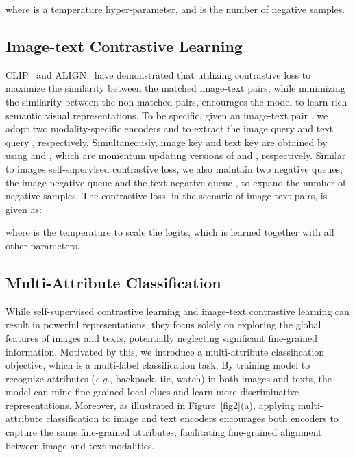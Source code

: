 \documentclass[final]{cvpr}
\begin{document}
\vspace{-1mm}
\noindent
where  is a temperature hyper-parameter, and  is the number of negative samples.

\subsection{Image-text Contrastive Learning}
CLIP~\cite{radford2021learning} and ALIGN~\cite{jia2021scaling} have demonstrated that utilizing contrastive loss to maximize the similarity between the matched image-text pairs, while minimizing the similarity between the non-matched pairs, encourages the model to learn rich semantic visual representations.
To be specific, given an image-text pair , we adopt two modality-specific encoders  and  to extract the image query  and text query , respectively. 
Simultaneously, image key  and text key  are obtained by using  and , which are momentum updating versions of  and , respectively. 
Similar to images self-supervised contrastive loss, we also maintain two negative queues, the image negative queue  and the text negative queue , to expand the number of negative samples.
The contrastive loss, in the scenario of image-text pairs, is given as:  \par
\begin{small}

\end{small}

\vspace{-2mm}
\noindent
where  is the temperature to scale the logits, which is learned together with all other parameters.

\subsection{Multi-Attribute Classification}
While self-supervised contrastive learning and image-text contrastive learning can result in powerful representations, they focus solely on exploring the global features of images and texts, potentially neglecting significant fine-grained information.
Motivated by this, we introduce a multi-attribute classification objective, which is a multi-label classification task. 
By training model to recognize attributes (\emph{e.g.}, backpack, tie, watch) in both images and texts, the model can mine fine-grained local clues and learn more discriminative representations.
Moreover, as illustrated in Figure~\ref{fig2}(a), applying multi-attribute classification to image and text encoders encourages both encoders to capture the same fine-grained attributes, facilitating fine-grained alignment between image and text modalities.
\end{document}
